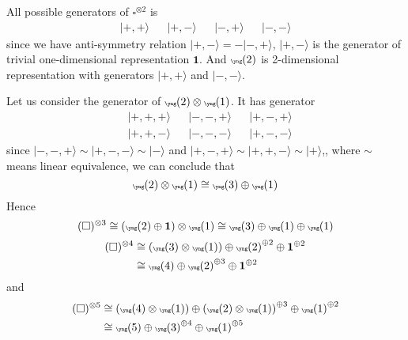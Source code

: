 \subsubsection{}
All possible generators of $\square^{\otimes2}$ is 
\[
\begin{aligned}
|+,+\rangle & & |+,- \rangle & & |-,+\rangle & & |-,-\rangle
\end{aligned}
\]
since we have anti-symmetry relation $|+,-\rangle = -|-,+\rangle$, $|+,-\rangle$ is the generator of trivial one-dimensional representation $\mathbf{1}$. And ${\tiny\yng(2)}$ is 2-dimensional representation with generators $|+,+\rangle$ and $|-,-\rangle$.

Let us consider the generator of ${\tiny\yng(2)} \otimes {\tiny\yng(1)}$. It has generator
\[
\begin{aligned}
&|+,+,+\rangle& & |-,-,+\rangle& & |+,-,+\rangle\\
&|+,+,-\rangle& & |-,-,-\rangle& & |+,-,-\rangle
\end{aligned}
\]
since $|-,-,+\rangle \sim |+,-,-\rangle \sim |-\rangle$ and $|+,-,+ \rangle \sim |+,+,-\rangle \sim |+\rangle$,, where $\sim$ means linear equivalence, we can conclude that 
\begin{equation}
	{\tiny\yng(2)} \otimes {\tiny\yng(1)} \cong {\tiny\yng(3)} \oplus {\tiny\yng(1)}
\end{equation}
Hence
\begin{equation}
	(\square)^{\otimes 3} \cong \left( {\tiny\yng(2)} \oplus \mathbf{1} \right) \otimes {\tiny\yng(1)} \cong {\tiny\yng(3)} \oplus {\tiny\yng(1)} \oplus {\tiny\yng(1)}
\end{equation}
\begin{equation}
	\begin{split}
	(\square)^{\otimes 4} &\cong \left({\tiny\yng(3)} \otimes {\tiny\yng(1)}\right) \oplus {\tiny\yng(2)}^{\oplus 2} \oplus \mathbf{1}^{\oplus 2}\\
	&\cong {\tiny\yng(4)} \oplus {\tiny\yng(2)}^{\oplus 3} \oplus \mathbf{1}^{\oplus 2}
	\end{split}
\end{equation}
and
\begin{equation}
	\begin{split}
	(\square)^{\otimes 5} &\cong \left({\tiny\yng(4)} \otimes {\tiny\yng(1)}\right) \oplus \left({\tiny\yng(2)} \otimes {\tiny\yng(1)}\right)^{\oplus 3} \oplus {\tiny\yng(1)}^{\oplus 2}\\
	&\cong {\tiny\yng(5)} \oplus {\tiny\yng(3)}^{\oplus 4} \oplus {\tiny\yng(1)}^{\oplus 5}
	\end{split}
\end{equation}

